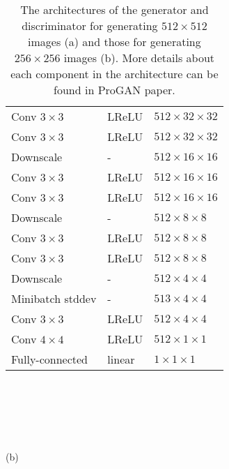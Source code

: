 \documentclass[journal, onecolumn]{IEEEtran}
\begin{document}
\begin{table}[H]
\begin{minipage}[t]{0.48\linewidth}
\begin{adjustbox}{width=0.72\columnwidth,center}
{\begin{tabular}[t]{|lll|}
Conv $3\times3$      & LReLU & $512\times32\times32$      \\
Conv $3\times3$      & LReLU & $512\times32\times32$      \\ 
Downscale & -      & $512\times16\times16$  \\ \hline

Conv $3\times3$      & LReLU & $512\times16\times16$      \\
Conv $3\times3$      & LReLU & $512\times16\times16$      \\ 
Downscale & -      & $512\times8\times8$  \\ \hline

Conv $3\times3$      & LReLU & $512\times8\times8$      \\
Conv $3\times3$      & LReLU & $512\times8\times8$      \\ 
Downscale & -      & $512\times4\times4$  \\ \hline

Minibatch stddev &- & $513\times4\times4$  \\ 
Conv $3\times3$      & LReLU & $512\times4\times4$      \\
Conv $4\times4$      & LReLU & $512\times1\times1$      \\ 
Fully-connected & linear      & $1\times1\times1$  \\ \hline
\end{tabular}
\\
\\
\\
\\
\\
(b)
}
\end{adjustbox}
\end{minipage}
\caption{The architectures of the generator and discriminator for generating $512\times 512$ images (a) and those for generating $256\times 256$ images (b). 
More details about each component in the architecture can be found in ProGAN paper\cite{karras2017progressive}.}
\end{table}
  \vspace{-0.5cm}
{}

\end{document}
